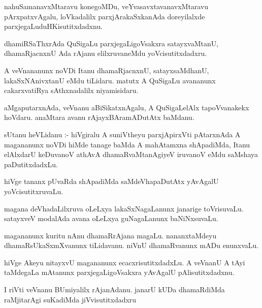 \documentclass{article}
\begin{document}
\begin{mn}
nahuSamanavxMtaravu konegoMDu, veYvasavxtavanavxMtaravu pArxpatxvAgalu,  
loVkadalilx parxjArakaSxkanAda doreyilalxde parxjegaLuduHKisutitxdadxnu.
\end{mn}

\begin{mn}
dhamiRSaThxrAda QuSigaLu parxjegaLigoVsakxra  satayxvaMtanU, dhamaRjacnxnU 
Ada rAjanu elilxruvaneMdu yoVcisutitxdadxru.
\end{mn}

\begin{mn}
A veVnananunx noVDi Itanu dhamaRjacnxnU, satayxsaMdhanU, lakaSxNAnivxtanU 
eMdu tiLidaru. matutx A QuSigaLu avananunx cakarxvatiRya sAthxnadalilx niyamisidaru. 
\end{mn}

\begin{mn}
aMgaputarxnAda, veVnanu aBiSikatxnAgalu, A QuSigaLelAlx tapoVvanakekx hoVdaru. 
anaMtara avanu rAjayxBAramADutAtx baMdanu. 
\end{mn}

\begin{mn}
sUtanu heVLidanu :- hiVgiralu A suniVtheyu parxjApirxVti pAtarxnAda A magananunx 
noVDi hiMde tanage baMda A mahAtamxna shApadiMda, Itanu elAlxdarU keDuvanoV 
athAvA  dhamaRvaMtanAgiyeV iruvanoV eMdu saMshaya paDutitxdadxLu.
\end{mn}

\begin{mn}
hiVge tananx pUvaRda shApadiMda saMdeVhapaDutAtx yAvAgalU yoVcisutitxruvaLu.
\end{mn}

\begin{mn}
magana deVhadaLilxruva oLeLxya lakaSxNagaLanunx janarige toVrisuvaLu.  
satayxveV modalAda avana oLeLxya guNagaLanunx baNiNxsuvaLu. 
\end{mn}

\begin{mn}
magananunx kuritu nAnu dhamaRrAjana magaLu. nananxtaMdeyu dhamaRsUkaSxmXvanunx 
tiLidavanu.  niVnU dhamaRvanunx  mADu enunxvaLu.
\end{mn}

\begin{mn}
hiVge Akeyu nitayxvU magananunx ecacxrisutitxdadxLu.  A veVnanU A tAyi taMdegaLa 
mAtanunx parxjegaLigoVsakxra  yAvAgalU pAlisutitxdadxnu.
\end{mn}

\begin{mn}
I riVti veVnanu BUmiyalilx rAjanAdanu.  janarU kUDa dhamaRdiMda raMjitarAgi suKadiMda jiVvisutitxdadxru
\end{mn}
\end{document}
